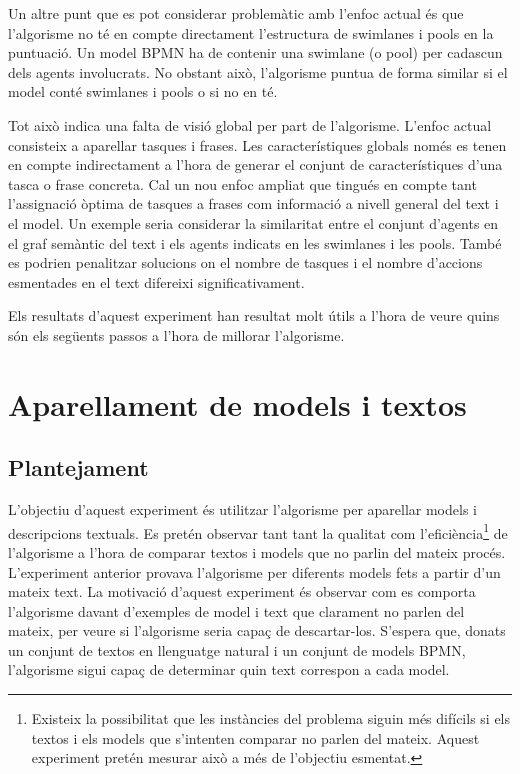 Un altre punt que es pot considerar problemàtic amb l'enfoc actual és que l'algorisme no té en compte directament l'estructura de swimlanes i pools en la puntuació. Un model BPMN ha de contenir una swimlane (o pool) per cadascun dels agents involucrats. No obstant això, l'algorisme puntua de forma similar si el model conté swimlanes i pools o si no en té.

Tot això indica una falta de visió global per part de l'algorisme. L'enfoc actual consisteix a aparellar tasques i frases. Les característiques globals només es tenen en compte indirectament a l'hora de generar el conjunt de característiques d'una tasca o frase concreta.  Cal un nou enfoc ampliat que tingués en compte tant l'assignació òptima de tasques a frases com informació a nivell general del text i el model. Un exemple seria considerar la similaritat entre el conjunt d'agents en el graf semàntic del text i els agents indicats en les swimlanes i les pools. També es podrien penalitzar solucions on el nombre de tasques i el nombre d'accions esmentades en el text difereixi significativament. 

Els resultats d'aquest experiment han resultat molt útils a l'hora de veure quins són els següents passos a l'hora de millorar l'algorisme.


\section{Aparellament de models i textos}
\label{sec:experiments-aparellament}
\subsection{Plantejament}

L'objectiu d'aquest experiment és utilitzar l'algorisme per aparellar models i descripcions textuals. Es pretén observar tant tant la qualitat com l'eficiència\footnote{Existeix la possibilitat que les instàncies del problema siguin més difícils si els textos i els models que s'intenten comparar no parlen del mateix. Aquest experiment pretén mesurar això a més de l'objectiu esmentat.} de l'algorisme a l'hora de comparar textos i models que no parlin del mateix procés. L'experiment anterior provava l'algorisme per diferents models fets a partir d'un mateix text. La motivació d'aquest experiment és observar com es comporta l'algorisme davant d'exemples de model i text que clarament no parlen del mateix, per veure si l'algorisme seria capaç de descartar-los. S'espera que, donats un conjunt de textos en llenguatge natural i un conjunt de models BPMN, l'algorisme sigui capaç de determinar quin text correspon a cada model.

